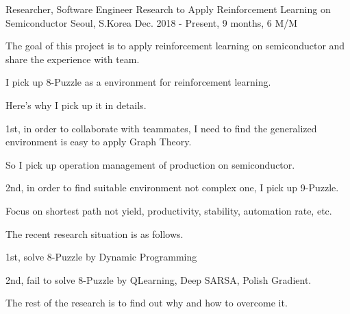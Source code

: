 \begin{cventries}
  \cventry
    {Researcher, Software Engineer} %
    {Research to Apply Reinforcement Learning on Semiconductor} %
    {Seoul, S.Korea} %
    {Dec. 2018 - Present, 9 months, 6 M/M} %
    {
      \begin{cvitems} %
        \item {The goal of this project is to apply reinforcement learning on semiconductor and share the experience with team.}
        \item {I pick up 8-Puzzle as a environment for reinforcement learning.}
        \item {Here's why I pick up it in details.}
        \item {1st, in order to collaborate with teammates, I need to find the generalized environment is easy to apply Graph Theory.}
        \item {So I pick up operation management of production on semiconductor.}
        \item {2nd, in order to find suitable environment not complex one, I pick up 9-Puzzle.}
        \item {Focus on shortest path not yield, productivity, stability, automation rate, etc.}
        \item {The recent research situation is as follows.}
        \item {1st, solve 8-Puzzle by Dynamic Programming}
        \item {2nd, fail to solve 8-Puzzle by QLearning, Deep SARSA, Polish Gradient.}
        \item {The rest of the research is to find out why and how to overcome it.}
      \end{cvitems}
    }


\end{cventries}
